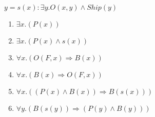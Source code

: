 \documentclass{article}
\begin{document}
\section{}
$y=s(x): \exists y.O(x,y) \wedge Ship(y)$
\begin{enumerate}
	\item $\exists x.(P(x))$
	\item $\exists x.(P(x) \land s(x))$
	\item $\forall x.(O(F, x) \Rightarrow B(x))$
	\item $\forall x.(B(x) \Rightarrow O(F,x))$
	\item $\forall x.((P(x) \land B(x)) \Rightarrow B(s(x)))$
	\item $\forall y.(B(s(y)) \Rightarrow (P(y) \land B(y)))$
\end{enumerate}
\end{document}
